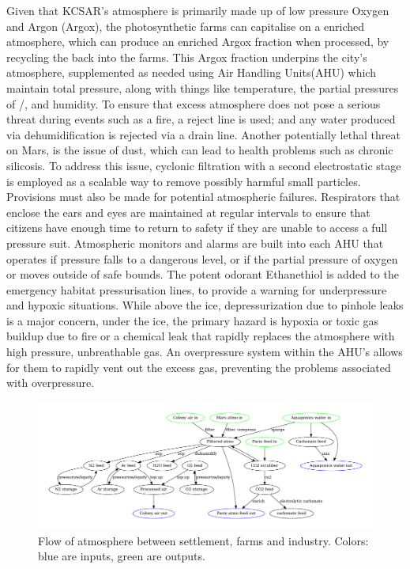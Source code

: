 \documentclass[fleqn,10pt]{Stylesheet} %
\begin{document}
Given that KCSAR’s atmosphere is primarily made up of low pressure Oxygen and Argon (Argox), the photosynthetic farms can capitalise on a  enriched atmosphere, which can produce an enriched Argox fraction when processed, by recycling the  back into the farms. This  Argox fraction underpins  the city’s atmosphere, supplemented as needed using Air Handling Units(AHU) which maintain total pressure, along with things like temperature, the partial pressures of /, and humidity. To ensure that excess atmosphere does not pose a serious threat during events such as a fire, a reject line is used; and any water produced via dehumidification is rejected via a drain line. Another potentially lethal threat on Mars, is the issue of dust, which can lead to health problems such as chronic silicosis. To address this issue, cyclonic filtration with a second electrostatic stage is employed as a scalable way to remove possibly harmful small particles. Provisions must also be made for potential atmospheric failures. Respirators that enclose the ears and eyes are maintained at regular intervals to ensure that citizens have enough time to return to safety if they are unable to access a full pressure suit. Atmospheric monitors and alarms are built into each AHU that operates if pressure falls to a dangerous level, or if the partial pressure of oxygen or  moves outside of safe bounds. The potent odorant Ethanethiol is added to the emergency habitat pressurisation lines, to provide a warning for underpressure and hypoxic situations. While above the ice, depressurization due to pinhole leaks is a major concern, under the ice, the primary hazard is hypoxia or toxic gas buildup due to fire or a chemical leak that rapidly replaces the atmosphere with high pressure, unbreathable gas. An overpressure system within the AHU’s allows for them to rapidly vent out the excess gas, preventing the problems associated with overpressure.

\begin{figure}
    \centering
    \includegraphics[width=\linewidth]{figures/fig_atmo.pdf}
    \caption{Flow of atmosphere between settlement, farms and industry. Colors: blue are inputs, green are outputs.}
    \label{fig:atmo_diagram}
\end{figure}
\end{document}
